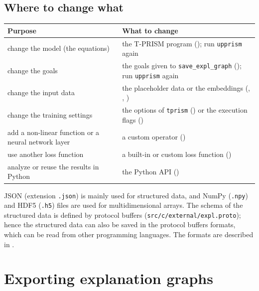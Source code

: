\documentclass[a4paper]{report}
\begin{document}
\subsection*{Where to change what}
\begin{center}
	\small
	\begin{tabular}{P{5.2cm}P{8.8cm}}
		\toprule
		Purpose & What to change \\
		\midrule
		change the model (the equations) & the T-PRISM program (); run {\tt upprism} again \\
		change the goals & the goals given to {\tt save\_expl\_graph} (); run {\tt upprism} again \\
		change the input data & the placeholder data or the embeddings (, , ) \\
		change the training settings & the options of {\tt tprism} () or the execution flags () \\
		add a non-linear function or a neural network layer & a custom operator () \\
		use another loss function & a built-in or custom loss function () \\
		analyze or reuse the results in Python & the Python API () \\
		\bottomrule
	\end{tabular}
\end{center}

JSON (extension {\tt .json}) is mainly used for structured data, and
NumPy ({\tt .npy}) and HDF5 ({\tt .h5}) files are used for
multidimensional arrays.  The schema of the structured data is defined by
protocol buffers ({\tt src/c/external/expl.proto}); hence the structured
data can also be saved in the protocol buffers formats, which can be read
from other programming languages.  The formats are described in
.

\section{Exporting explanation graphs}
\label{sec:save_expl_graph}
\end{document}
